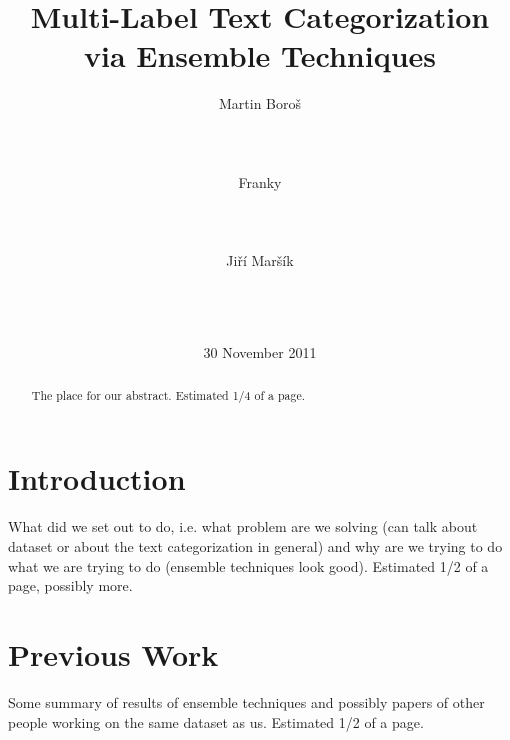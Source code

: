 \documentclass{acm_proc_article-sp}
\begin{document}
\title{Multi-Label Text Categorization via Ensemble Techniques}

\author{
\alignauthor
Martin Boro\v{s}\\
       \\
       \\
       \\
\alignauthor
Franky\\
       \\
       \\
       \\
\alignauthor
Ji\v{r}\'{i} Mar\v{s}\'{i}k\\
       \\
       \\
       \\
       }

\date{30 November 2011}

\maketitle
\begin{abstract}
The place for our abstract. Estimated 1/4 of a page.
\end{abstract}




\section{Introduction}
What did we set out to do, i.e. what problem are we solving (can talk about
dataset or about the text categorization in general) and why are we trying to do
what we are trying to do (ensemble techniques look good). Estimated 1/2 of a
page, possibly more.

\section{Previous Work}
Some summary of results of ensemble techniques and possibly papers of other
people working on the same dataset as us. Estimated 1/2 of a page.
\end{document}
